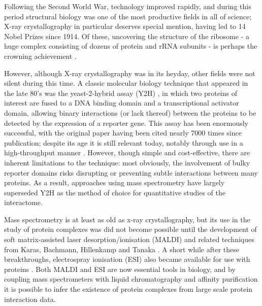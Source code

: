 \documentclass[a4paper,11pt,twoside,openright]{scrbook}
\begin{document}
Following the Second World War, technology improved rapidly, and during this period structural biology was one of the most productive fields in all of science; X-ray crystallography in particular deserves special mention, having led to 14 Nobel Prizes since 1914. Of these, uncovering the structure of the ribosome - a huge complex consisting of dozens of protein and rRNA subunits - is perhaps the crowning achievement \cite{Schluenzen2000,Ramakrishnan2000,Ban2000}.

However, although X-ray crystallography was in its heyday, other fields were not silent during this time. A classic molecular biology technique that appeared in the late 80's was the yeast-2-hybrid assay (Y2H) \cite{Fields1989}, in which two proteins of interest are fused to a DNA binding domain and a transcriptional activator domain, allowing binary interactions (or lack thereof) between the proteins to be detected by the expression of a reporter gene. This assay has been enormously successful, with the original paper having been cited nearly 7000 times since publication; despite its age it is still relevant today, notably through use in a high-throughput manner \cite{Rajagopala2014}. However, though simple and cost-effective, there are inherent limitations to the technique: most obviously, the involvement of bulky reporter domains risks disrupting or preventing subtle interactions between many proteins. As a result, approaches using mass spectrometry have largely superseded Y2H as the method of choice for quantitative studies of the interactome.

Mass spectrometry is at least as old as x-ray crystallography, but its use in the study of protein complexes was did not become possible until the development of soft matrix-assisted laser desorption/ionisation (MALDI) and related techniques from Karas, Bachmann, Hillenkamp and Tanaka \cite{Karas1985,Tanaka1988}. A short while after these breakthroughs, electrospray ionisation (ESI) also became available for use with proteins \cite{Fenn1989}. Both MALDI and ESI are now essential tools in biology, and by coupling mass spectrometers with liquid chromatography and affinity purification it is possible to infer the existence of protein complexes from large scale protein interaction data.
\end{document}
